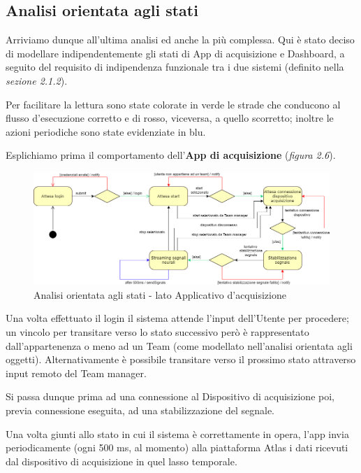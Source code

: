 \subsection{Analisi orientata agli stati}
Arriviamo dunque all'ultima analisi ed anche la più complessa.\newline
Qui è stato deciso di modellare indipendentemente gli stati di App di acquisizione e Dashboard, a seguito del requisito di indipendenza funzionale tra i due sistemi (definito nella \emph{sezione 2.1.2}).\newline

\noindent Per facilitare la lettura sono state colorate in verde le strade che conducono al flusso d'esecuzione corretto e di rosso, viceversa, a quello scorretto; inoltre le azioni periodiche sono state evidenziate in blu.\newline

\noindent Esplichiamo prima il comportamento dell'{\bf App di acquisizione} (\emph{figura 2.6}).
\vspace{5mm}
\begin{figure}[H]
  \centering
  \includegraphics[width=1.0\textwidth]{img/App acquisizione - fsm.png}
  \caption{Analisi orientata agli stati - lato Applicativo d'acquisizione}
\end{figure}
\vspace{5mm}
\noindent Una volta effettuato il login il sistema attende l'input dell'Utente per procedere; un vincolo per transitare verso lo stato successivo però è rappresentato dall'appartenenza o meno ad un Team (come modellato nell'analisi orientata agli oggetti).\newline
Alternativamente è possibile transitare verso il prossimo stato attraverso input remoto del Team manager.

\noindent Si passa dunque prima ad una connessione al Dispositivo di acquisizione poi, previa connessione eseguita, ad una stabilizzazione del segnale.\newline

\noindent Una volta giunti allo stato in cui il sistema è correttamente in opera, l'app invia periodicamente (ogni 500 ms, al momento) alla piattaforma Atlas i dati ricevuti dal dispositivo di acquisizione in quel lasso temporale.\newline

